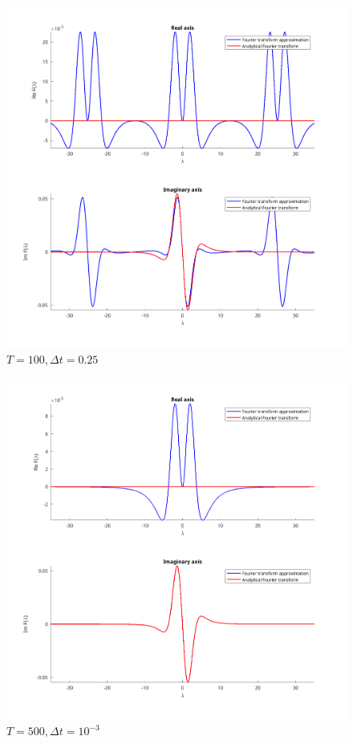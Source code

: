 \begin{figure}[h]
\centering
\includegraphics[width=\textwidth, height=0.35\textheight]{Aliasing}
\caption{$ T = 100, \Delta t = 0.25 $}
\end{figure}

\begin{figure}[h]
\centering
\includegraphics[width=\textwidth, height=0.35\textheight]{Aliasing-2}
\caption{$ T = 500, \Delta t = 10^{-3} $}
\end{figure}